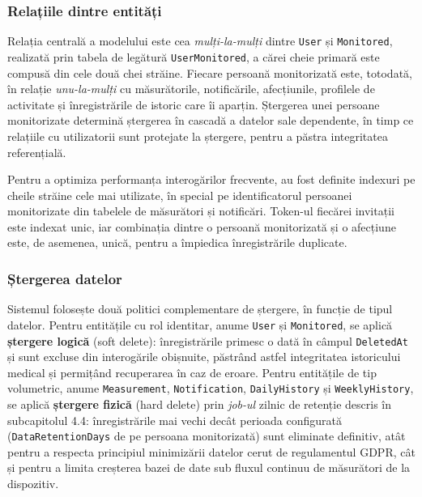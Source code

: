 ﻿\documentclass[12pt,a4paper,twoside]{article}
\begin{document}
\subsubsection{Relațiile dintre entități}

Relația centrală a modelului este cea \textit{mulți-la-mulți} dintre \texttt{User} și \texttt{Monitored}, realizată prin tabela de legătură \texttt{UserMonitored}, a cărei cheie primară este compusă din cele două chei străine. Fiecare persoană monitorizată este, totodată, în relație \textit{unu-la-mulți} cu măsurătorile, notificările, afecțiunile, profilele de activitate și înregistrările de istoric care îi aparțin. Ștergerea unei persoane monitorizate determină ștergerea în cascadă a datelor sale dependente, în timp ce relațiile cu utilizatorii sunt protejate la ștergere, pentru a păstra integritatea referențială.

Pentru a optimiza performanța interogărilor frecvente, au fost definite indexuri pe cheile străine cele mai utilizate, în special pe identificatorul persoanei monitorizate din tabelele de măsurători și notificări. Token-ul fiecărei invitații este indexat unic, iar combinația dintre o persoană monitorizată și o afecțiune este, de asemenea, unică, pentru a împiedica înregistrările duplicate.

\subsubsection{Ștergerea datelor}

Sistemul folosește două politici complementare de ștergere, în funcție de tipul datelor. Pentru entitățile cu rol identitar, anume \texttt{User} și \texttt{Monitored}, se aplică \textbf{ștergere logică} (soft delete): înregistrările primesc o dată în câmpul \texttt{DeletedAt} și sunt excluse din interogările obișnuite, păstrând astfel integritatea istoricului medical și permițând recuperarea în caz de eroare. Pentru entitățile de tip volumetric, anume \texttt{Measurement}, \texttt{Notification}, \texttt{DailyHistory} și \texttt{WeeklyHistory}, se aplică \textbf{ștergere fizică} (hard delete) prin \textit{job-ul} zilnic de retenție descris în subcapitolul 4.4: înregistrările mai vechi decât perioada configurată (\texttt{DataRetentionDays} de pe persoana monitorizată) sunt eliminate definitiv, atât pentru a respecta principiul minimizării datelor cerut de regulamentul GDPR, cât și pentru a limita creșterea bazei de date sub fluxul continuu de măsurători de la dispozitiv.
\end{document}
